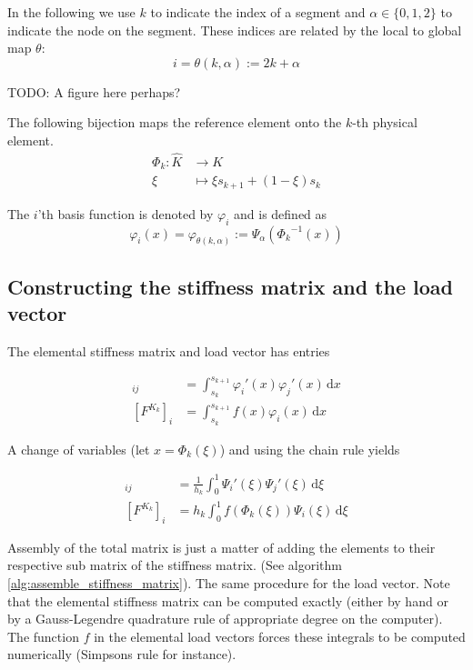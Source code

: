In the following we use \( k \) to indicate the index
of a segment and \( \alpha \in \{  0, 1, 2  \} \) to indicate
the node on the segment. These indices are related by the
local to global map \( \theta \):
\begin{equation}
  \label{eq:loc2glob}
  i = \theta(k, \alpha) := 2k + \alpha    
\end{equation}

TODO: A figure here perhaps?

The following bijection maps the reference element onto
the \( k \)-th physical element.
\begin{align}
  \Phi_k : \hat{K} &\longrightarrow  K \\
  \xi & \longmapsto \xi s_{k+1} + (1-\xi) s_{k}
\end{align}

The \( i \)'th basis function is denoted by \( \varphi_i \)
and is defined as
\begin{equation}
  \varphi_i(x) = \varphi_{\theta(k, \alpha)} := \Psi_{\alpha}({{\Phi_k}^{-1}(x) })
\end{equation}

\subsection{Constructing the stiffness matrix and the load vector}

The elemental stiffness matrix and load vector has entries

\begin{align}
  [A^{K_k}]_{ij}
    &=  \int_{s_k}^{s_{k+1}} \varphi_i'(x) \varphi_j'(x) \,\mathrm{d}x\\
  [F^{K_k}]_i
    &= \int_{s_k}^{s_{k+1}} f\left(x\right) \varphi_i\left(x\right) \,\mathrm{d}x
\end{align}

A change of variables (let \( x = \Phi_k(\xi) \)) and using the chain rule yields

\begin{align}
  [A^{K_k}]_{ij}
    &= \frac{1}{h_k} \int_{0}^{1} \Psi_i'(\xi)\Psi_j'(\xi) \,\mathrm{d}\xi \\
  [F^{K_k}]_i
    &= h_k \int_{0}^{1} f\left(\Phi_k\left(\xi\right)\right) \Psi_i\left(\xi\right) \,\mathrm{d}\xi
\end{align}

Assembly of the total matrix is just a matter of
adding the elements to their respective sub matrix
of the stiffness matrix. (See algorithm \ref{alg:assemble_stiffness_matrix}).
The same procedure for the load vector.
Note that the elemental stiffness matrix
can be computed exactly (either by hand or by a Gauss-Legendre quadrature rule of appropriate
degree on the computer). The function \( f \) in the elemental load vectors
forces these integrals to be computed numerically (Simpsons rule for instance).

